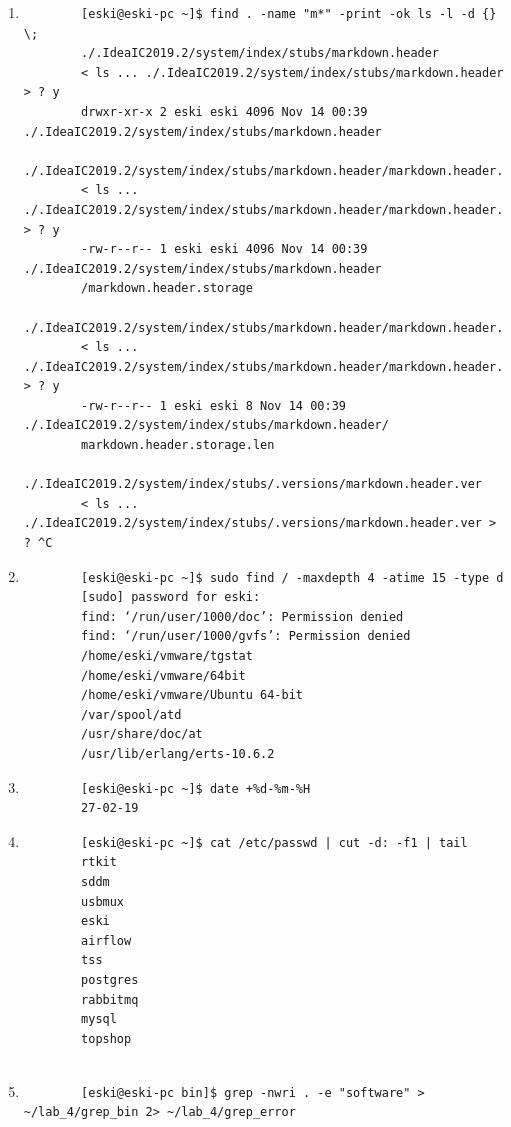 \documentclass{article}
\begin{document}
\begin{enumerate}
\begin{verbatim}
		[eski@eski-pc sbin]$ tail ~/lab_4/files_sbin 
		pppd
		pactree
		jack_bufsize
		bg5latex
		xxd
		pkaction
		rdjpgcom
		jupyter-console
		csc
		glsync32
		\end{verbatim}
		
		\small
		\item \begin{verbatim}
		[eski@eski-pc ~]$ find . -name "m*" -print -ok ls -l -d {} \;
		./.IdeaIC2019.2/system/index/stubs/markdown.header
		< ls ... ./.IdeaIC2019.2/system/index/stubs/markdown.header > ? y
		drwxr-xr-x 2 eski eski 4096 Nov 14 00:39 ./.IdeaIC2019.2/system/index/stubs/markdown.header
		./.IdeaIC2019.2/system/index/stubs/markdown.header/markdown.header.storage
		< ls ... ./.IdeaIC2019.2/system/index/stubs/markdown.header/markdown.header.storage > ? y
		-rw-r--r-- 1 eski eski 4096 Nov 14 00:39 ./.IdeaIC2019.2/system/index/stubs/markdown.header
		/markdown.header.storage
		./.IdeaIC2019.2/system/index/stubs/markdown.header/markdown.header.storage.len
		< ls ... ./.IdeaIC2019.2/system/index/stubs/markdown.header/markdown.header.storage.len > ? y
		-rw-r--r-- 1 eski eski 8 Nov 14 00:39 ./.IdeaIC2019.2/system/index/stubs/markdown.header/
		markdown.header.storage.len
		./.IdeaIC2019.2/system/index/stubs/.versions/markdown.header.ver
		< ls ... ./.IdeaIC2019.2/system/index/stubs/.versions/markdown.header.ver > ? ^C
		\end{verbatim}
		\large
		\item \begin{verbatim}
		[eski@eski-pc ~]$ sudo find / -maxdepth 4 -atime 15 -type d
		[sudo] password for eski: 
		find: ‘/run/user/1000/doc’: Permission denied
		find: ‘/run/user/1000/gvfs’: Permission denied
		/home/eski/vmware/tgstat
		/home/eski/vmware/64bit
		/home/eski/vmware/Ubuntu 64-bit
		/var/spool/atd
		/usr/share/doc/at
		/usr/lib/erlang/erts-10.6.2
		\end{verbatim}
		
		\item 
		\begin{verbatim}
		[eski@eski-pc ~]$ date +%d-%m-%H
		27-02-19
		\end{verbatim}
		\item \begin{verbatim}
		[eski@eski-pc ~]$ cat /etc/passwd | cut -d: -f1 | tail
		rtkit
		sddm
		usbmux
		eski
		airflow
		tss
		postgres
		rabbitmq
		mysql
		topshop
		
		\end{verbatim}
		\small
		\item\begin{verbatim}
		[eski@eski-pc bin]$ grep -nwri . -e "software" > ~/lab_4/grep_bin 2> ~/lab_4/grep_error
		

\end{verbatim}
\end{enumerate}
\end{document}
